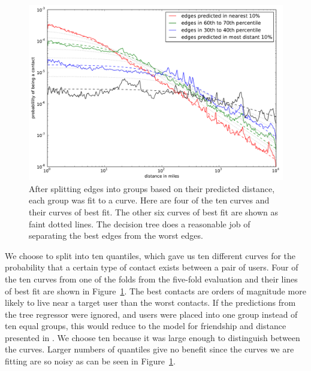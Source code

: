 \documentclass[letterpaper]{article}
\begin{document}
\begin{figure}[tbh]
\centering
\includegraphics[width=\linewidth]{figures/near_prob_fit.pdf}
\caption{
After splitting edges into groups based on their predicted distance, each group
was fit to a curve. Here are four of the ten curves and their curves of best
fit. The other six curves of best fit are shown as faint dotted lines. The
decision tree does a reasonable job of separating the best edges from the worst
edges.
}
\label{fig:NearProbFit}
\end{figure}

We choose to split into ten quantiles, which gave us ten different curves for the
probability that a certain type of contact exists between a pair of users.
%
Four of the ten curves from one of the folds from the five-fold evaluation and
their lines of best fit are shown in Figure~\ref{fig:NearProbFit}.
%
The best contacts are orders of magnitude more
likely to live near a target user than the worst contacts.
%
If the predictions from the tree regressor were ignored, and users were placed
into one group instead of ten equal groups, this would reduce to the model
for friendship and distance presented in \cite{backstrom2010find}.
%
We choose ten because it was large enough to distinguish between the curves.
%
Larger numbers of quantiles give no benefit since the curves we are
fitting are so noisy as can be seen in Figure~\ref{fig:NearProbFit}.
\end{document}
